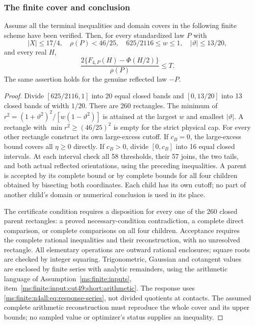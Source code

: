 \subsubsection{The finite cover and conclusion}
\begin{proposition}
\label{ms:finite:n4all:prop:certificate}
Assume all the terminal inequalities and domain covers in the following
finite scheme have been verified. Then, for every standardized law $P$ with
\[
 |X|\le17/4,\quad \rho(P)<46/25,\quad
 625/2116\le w\le1,\quad |\vartheta|\le13/20,
\]
and every real $H$,
\[
 \frac{2\{F_{4,P}(H)-\Phi(H/2)\}}{\rho(P)}\le T.
\]
The same assertion holds for the genuine reflected law $-P$.
\end{proposition}
\begin{proof}
Divide $[625/2116,1]$ into 20 equal closed bands and $[0,13/20]$
into 13 closed bands of width $1/20$. There are 260 rectangles.
The minimum of
$r^2=(1+\vartheta^2)^2/[w(1-\vartheta^2)]$ is attained at the
largest $w$ and smallest $|\vartheta|$. A rectangle with
$\min r^2\ge(46/25)^2$ is empty for the strict physical cap.
For every other rectangle construct its own large-excess cutoff.
If $c_B=0$, the large-excess bound covers all $\eta\ge0$ directly.
If $c_B>0$, divide $[0,c_B]$ into 16 equal closed intervals. At each interval
check all 58 thresholds, their 57 joins, the two tails, and both
actual reflected orientations, using the preceding inequalities.
A parent is accepted by its complete bound or by complete bounds
for all four children obtained by bisecting both coordinates.
Each child has its own cutoff; no part of another child's domain
or numerical conclusion is used in its place.

The certificate condition requires a disposition for every one of the
260 closed parent rectangles: a proved necessary-condition contradiction,
a complete direct comparison, or complete comparisons on all four children.
Acceptance requires the complete rational inequalities and their
reconstruction, with no unresolved rectangle.
All elementary operations
are outward rational enclosures; square roots are checked by integer
squaring. Trigonometric, Gaussian and cotangent values are enclosed
by finite series with analytic remainders, using the arithmetic
language of Assumption~\ref{ms:finite:inputs}, item~\ref{ms:finite:input:cut49:short:arithmetic}. The response uses
\eqref{ms:finite:n4all:eq:response-series}, not divided quotients at contacts.
The assumed complete arithmetic reconstruction must reproduce the whole cover
and its upper bounds; no sampled value or optimizer's status supplies
an inequality.


\end{proof}
